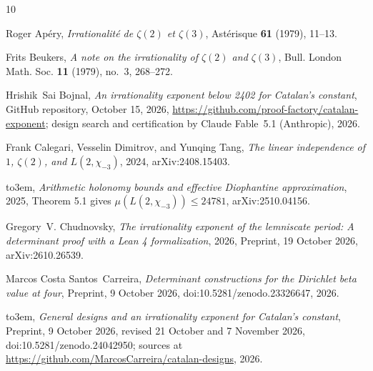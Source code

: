 \documentclass[11pt]{amsart}
\theoremstyle{definition}
\theoremstyle{remark}
\numberwithin{equation}{section}
\begin{document}
\providecommand{\bysame}{\leavevmode\hbox to3em{\hrulefill}\thinspace}
\providecommand{\MR}{\relax\ifhmode\unskip\space\fi MR }
\providecommand{\MRhref}[2]{%
  \href{http://www.ams.org/mathscinet-getitem?mr=#1}{#2}
}
\providecommand{\href}[2]{#2}
\begin{thebibliography}{10}

Roger Ap\'ery, \emph{Irrationalit\'e de {$\zeta(2)$} et {$\zeta(3)$}},
  Ast\'erisque \textbf{61} (1979), 11--13.

Frits Beukers, \emph{A note on the irrationality of {$\zeta(2)$} and
  {$\zeta(3)$}}, Bull. London Math. Soc. \textbf{11} (1979), no.~3, 268--272.

Hrishik~Sai Bojnal, \emph{An irrationality exponent below 2402 for {C}atalan's
  constant}, GitHub repository, October 15, 2026,
  \url{https://github.com/proof-factory/catalan-exponent}; design search and
  certification by Claude Fable~5.1 (Anthropic), 2026.

Frank Calegari, Vesselin Dimitrov, and Yunqing Tang, \emph{The linear
  independence of {$1$}, {$\zeta(2)$}, and {$L(2,\chi_{-3})$}}, 2024,
  \href{https://arxiv.org/abs/2408.15403}{arXiv:2408.15403}.

\bysame, \emph{Arithmetic holonomy bounds and effective {D}iophantine
  approximation}, 2025, Theorem 5.1 gives $\mu(L(2,\chi_{-3}))\le 24781$,
  \href{https://arxiv.org/abs/2510.04156}{arXiv:2510.04156}.

Gregory~V. Chudnovsky, \emph{The irrationality exponent of the lemniscate
  period: {A} determinant proof with a {L}ean 4 formalization}, 2026, Preprint,
  19 October 2026, \href{https://arxiv.org/abs/2610.26539}{arXiv:2610.26539}.

Marcos Costa Santos~Carreira, \emph{Determinant constructions for the
  {D}irichlet beta value at four}, Preprint, 9 October 2026,
  \href{https://doi.org/10.5281/zenodo.23326647}{doi:10.5281/zenodo.23326647},
  2026.

\bysame, \emph{General designs and an irrationality exponent for {C}atalan's
  constant}, Preprint, 9 October 2026, revised 21 October and 7 November 2026,
  \href{https://doi.org/10.5281/zenodo.24042950}{doi:10.5281/zenodo.24042950};
  sources at \url{https://github.com/MarcosCarreira/catalan-designs}, 2026.


\end{thebibliography}
\end{document}
